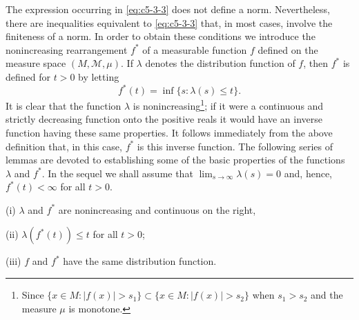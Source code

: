 The expression occurring in \eqref{eq:c5-3-3} does not define a norm.
Nevertheless, there are inequalities equivalent to \eqref{eq:c5-3-3} that, in
most cases, involve the finiteness of a norm. In order to obtain these
conditions we introduce the nonincreasing rearrangement $f^{*}$ of a measurable
function $f$ defined on the measure space $(M, \mathcal{M}, \mu)$. If $\lambda$
denotes the distribution function of $f$, then $f^{*}$ is defined for $t > 0$
by letting
\[
f^{*}(t)=\inf\{s : \lambda(s)\leq t\}.
\]
It is clear that the function $\lambda$ is
nonincreasing\footnote{Since $\{x \in M : |f(x)| > s_{1}\} \subset \{x \in M :
|f(x)| > s_{2}\}$ when $s_{1} > s_{2}$ and the measure $\mu$ is monotone.}; if
it were a continuous and strictly decreasing function onto the positive reals
it would have an inverse function having these same properties. It follows
immediately from the above definition that, in this case, $f^{*}$ is this
inverse function. The following series of lemmas are devoted to establishing
some of the basic properties of the functions $\lambda$ and $f^{*}$. In the
sequel we shall assume that $\lim_{s \to \infty}\lambda(s) = 0$ and, hence,
$f^{*}(t) < \infty$ for all $t > 0$.

\begin{lemma}\label{lem:c5-3-4}
\textup{(i)} $\lambda$ and $f^{*}$ are nonincreasing and continuous on the
right,

\textup{(ii)} $\lambda(f^{*}(t)) \leq t$ for all $t > 0$;

\textup{(iii)} $f$ and $f^{*}$ have the same distribution function.
\end{lemma}

